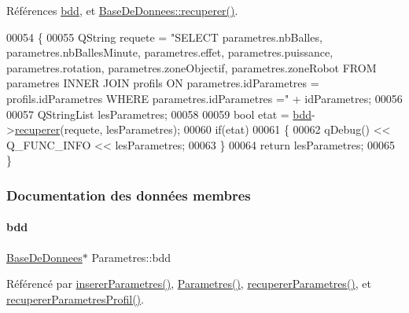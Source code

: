 Références \hyperlink{class_parametres_a1e21034f7e758d93974e0dc070d47dee}{bdd}, et \hyperlink{class_base_de_donnees_a77539baad389f5acf754cd2cd452403e}{Base\+De\+Donnees\+::recuperer()}.


\begin{DoxyCode}
00054 \{
00055     QString requete = \textcolor{stringliteral}{"SELECT parametres.nbBalles, parametres.nbBallesMinute, parametres.effet,
       parametres.puissance, parametres.rotation, parametres.zoneObjectif, parametres.zoneRobot FROM parametres INNER JOIN
       profils ON parametres.idParametres = profils.idParametres WHERE parametres.idParametres ="} + idParametres;
00056 
00057     QStringList lesParametres;
00058 
00059     \textcolor{keywordtype}{bool} etat = \hyperlink{class_parametres_a1e21034f7e758d93974e0dc070d47dee}{bdd}->\hyperlink{class_base_de_donnees_a77539baad389f5acf754cd2cd452403e}{recuperer}(requete, lesParametres);
00060     \textcolor{keywordflow}{if}(etat)
00061     \{
00062         qDebug() << Q\_FUNC\_INFO << lesParametres;
00063     \}
00064     \textcolor{keywordflow}{return} lesParametres;
00065 \}
\end{DoxyCode}


\subsubsection{Documentation des données membres}
\mbox{\label{class_parametres_a1e21034f7e758d93974e0dc070d47dee}} 
\paragraph{\texorpdfstring{bdd}{bdd}}
{\footnotesize\ttfamily \hyperlink{class_base_de_donnees}{Base\+De\+Donnees}$\ast$ Parametres\+::bdd\hspace{0.3cm}{\ttfamily [private]}}



Référencé par \hyperlink{class_parametres_a0102cadfb1bce5a8e82d6c12661fccf8}{inserer\+Parametres()}, \hyperlink{class_parametres_a5197a69e0f07e253e6119b4af95344f4}{Parametres()}, \hyperlink{class_parametres_a853872796d32655f3f1ffc090b6d076a}{recuperer\+Parametres()}, et \hyperlink{class_parametres_ac91b8cb3a293f27eeb7d87673889de15}{recuperer\+Parametres\+Profil()}.

\mbox{\label{class_parametres_a3bff192351dd25f4109b258e954cecbf}} 
